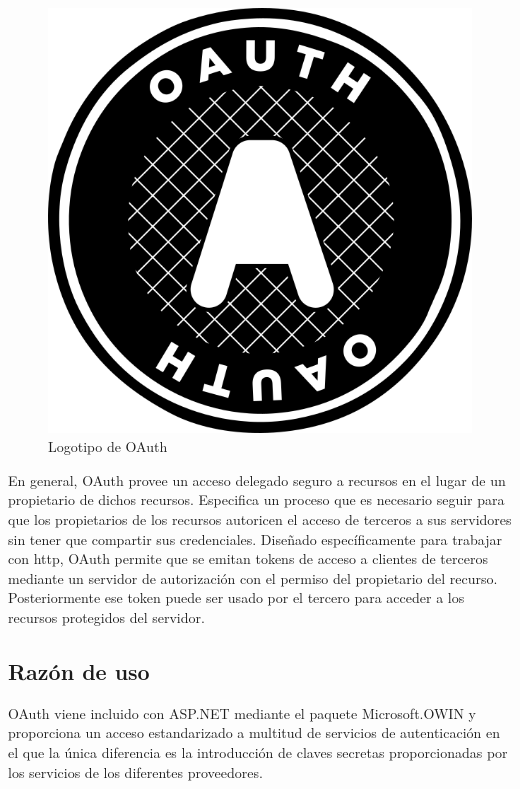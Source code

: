 \begin{figure}[!htbp]
	\centering
	\includegraphics[scale=0.50]{fig/oauth_logo}
	\caption{Logotipo de OAuth}
\end{figure}

En general, OAuth provee un acceso delegado seguro a recursos en el lugar de un propietario de dichos recursos. Especifica un proceso que es necesario seguir para que los propietarios de los recursos autoricen el acceso de terceros a sus servidores sin tener que compartir sus credenciales. Diseñado específicamente para trabajar con \acrshort{http}, OAuth permite que se emitan tokens de acceso a clientes de terceros mediante un servidor de autorización con el permiso del propietario del recurso. Posteriormente ese token puede ser usado por el tercero para acceder a los recursos protegidos del servidor.

\subsection{Razón de uso}

OAuth viene incluido con ASP.NET mediante el paquete Microsoft.OWIN y proporciona un acceso estandarizado a multitud de servicios de autenticación en el que la única diferencia es la introducción de claves secretas proporcionadas por los servicios de los diferentes proveedores.

